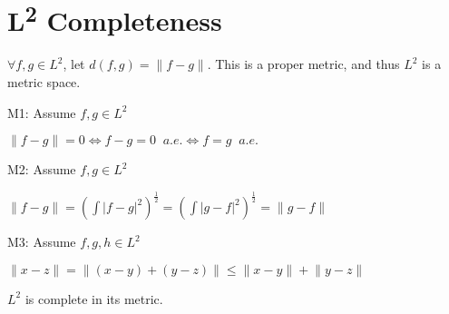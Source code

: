 \documentclass[letterpaper,12pt,fleqn]{article}
\newcommand{\abs}[1]{\left|#1\right|}
\newcommand{\norm}[1]{\lVert#1\rVert}
\begin{document}
\section*{L\textsuperscript{2} Completeness}

\begin{theorem}
$\forall f,g\in L^2$, let $d(f,g)=\norm{f-g}$. This is a proper metric, and
thus $L^2$ is a metric space.
\end{theorem}

\begin{theproof}
\listbreak
\begin{description}
\item{M1: Assume $f,g\in L^2$}

$\norm{f-g}=0\iff f-g=0\;\;a.e.\iff f=g\;\;a.e.$

\item{M2: Assume $f,g\in L^2$}

$\norm{f-g}=\left(\int\abs{f-g}^2\right)^{\frac{1}{2}}=
    \left(\int\abs{g-f}^2\right)^{\frac{1}{2}}=\norm{g-f}$

\item{M3: Assume $f,g,h\in L^2$}

$\norm{x-z}=\norm{(x-y)+(y-z)}\le\norm{x-y}+\norm{y-z}$
\end{description}
\end{theproof}

\begin{theorem}
$L^2$ is complete in its metric.
\end{theorem}
\end{document}
